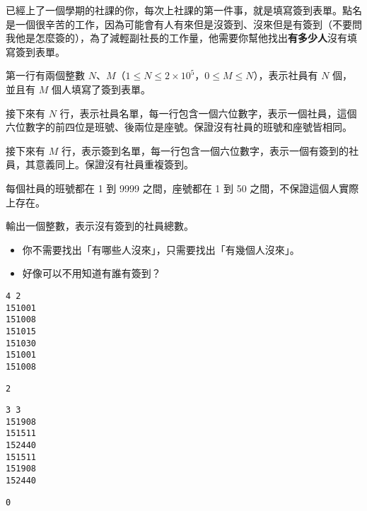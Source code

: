 
已經上了一個學期的社課的你，每次上社課的第一件事，就是填寫簽到表單。點名是一個很辛苦的工作，因為可能會有人有來但是沒簽到、沒來但是有簽到（不要問我他是怎麼簽的），為了減輕副社長的工作量，他需要你幫他找出\textbf{有多少人}沒有填寫簽到表單。


第一行有兩個整數 $N$、$M$（$1 \leq N \leq 2 \times 10^5$，$0 \leq M \leq N$），表示社員有 $N$ 個，並且有 $M$ 個人填寫了簽到表單。

接下來有 $N$ 行，表示社員名單，每一行包含一個六位數字，表示一個社員，這個六位數字的前四位是班號、後兩位是座號。保證沒有社員的班號和座號皆相同。

接下來有 $M$ 行，表示簽到名單，每一行包含一個六位數字，表示一個有簽到的社員，其意義同上。保證沒有社員重複簽到。

每個社員的班號都在 1 到 9999 之間，座號都在 1 到 50 之間，不保證這個人實際上存在。


輸出一個整數，表示沒有簽到的社員總數。


\begin{itemize}
    \item 你不需要找出「有哪些人沒來」，只需要找出「有幾個人沒來」。
    \item 好像可以不用知道有誰有簽到？
\end{itemize}


\begin{multicols}{2}
\begin{lstlisting}
4 2
151001
151008
151015
151030
151001
151008
\end{lstlisting}
\columnbreak
{}
\begin{lstlisting}
2
\end{lstlisting}
\end{multicols}


\begin{multicols}{2}
\begin{lstlisting}
3 3
151908
151511
152440
151511
151908
152440
\end{lstlisting}
\columnbreak
{}
\begin{lstlisting}
0
\end{lstlisting}
\end{multicols}

